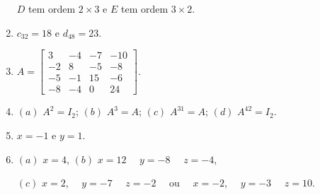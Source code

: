 \documentclass{report}
\begin{document}
\begin{enumerate}
$D$ tem ordem $2 \times 3$ \hspace{0.5cm} e \hspace{0.5cm} $E$ tem
ordem $3 \times 2$.


\item $c_{32}=18$ \hspace{0.3cm} e \hspace{0.3cm} $d_{48}=23$.



\item $A= \left[
\begin{array}{rrrr}
3 & -4 & -7 & -10 \\
-2 & 8 & -5 & -8 \\
-5 & -1 & 15 & -6 \\
-8 & -4 & 0 & 24
\end{array}
\right]$.

\item $(a)$ $A^2 = I_2$; \hspace{1.5cm} $(b)$
$A^3=A$;\hspace{1.5cm} $(c)$ $A^{31}=A$; \hspace{1.5cm} $(d)$
$A^{42}=I_2$.


\item $x = -1$ \hspace{0.5cm} e \hspace{0.5cm} $y =1$.


\item $(a)$ $x =4$, \hspace{1cm}  $(b)$ $x =12$ \ \ $y =-8$ \ \ $z
=-4$,

$(c)$ $x= 2$, \ \ $ y=-7$ \ \ $ z = -2$ \ \ ou \ \ $x= -2$, \ \ $
y=-3$ \ \ $ z = 10$.


\end{enumerate}
\end{document}

